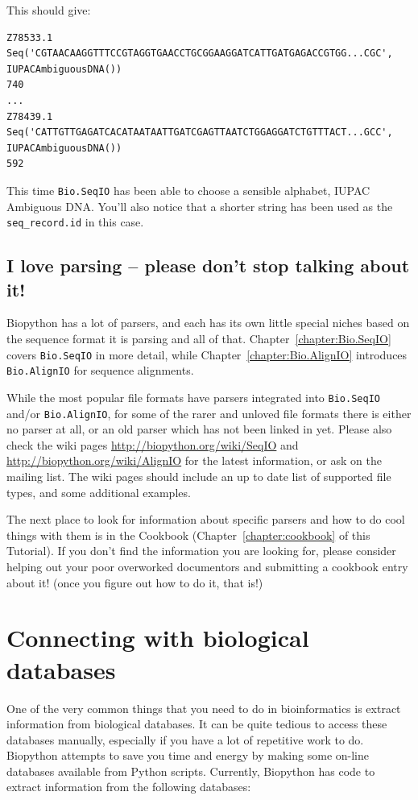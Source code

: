 \documentclass{report}
\begin{document}
\noindent This should give:

\begin{verbatim}
Z78533.1
Seq('CGTAACAAGGTTTCCGTAGGTGAACCTGCGGAAGGATCATTGATGAGACCGTGG...CGC', IUPACAmbiguousDNA())
740
...
Z78439.1
Seq('CATTGTTGAGATCACATAATAATTGATCGAGTTAATCTGGAGGATCTGTTTACT...GCC', IUPACAmbiguousDNA())
592
\end{verbatim}

This time \verb|Bio.SeqIO| has been able to choose a sensible alphabet, IUPAC Ambiguous DNA.  You'll also notice that a shorter string has been used as the \verb|seq_record.id| in this case.

\subsection{I love parsing -- please don't stop talking about it!}

Biopython has a lot of parsers, and each has its own little special niches based on the sequence format it is parsing and all of that.  Chapter~\ref{chapter:Bio.SeqIO} covers \verb|Bio.SeqIO| in more detail, while Chapter~\ref{chapter:Bio.AlignIO} introduces \verb|Bio.AlignIO| for sequence alignments.

While the most popular file formats have parsers integrated into \verb|Bio.SeqIO| and/or \verb|Bio.AlignIO|, for some of the rarer and unloved file formats there is either no parser at all, or an old parser which has not been linked in yet.
Please also check the wiki pages \url{http://biopython.org/wiki/SeqIO} and \url{http://biopython.org/wiki/AlignIO} for the latest information, or ask on the mailing list. The wiki pages should include an up to date list of supported file types, and some additional  examples.

The next place to look for information about specific parsers and how to do cool things with them is in the Cookbook (Chapter~\ref{chapter:cookbook} of this Tutorial). If you don't find the information you are looking for, please consider helping out your poor overworked documentors and submitting a cookbook entry about it! (once you figure out how to do it, that is!)

\section{Connecting with biological databases}
\label{sec:connecting-with-biological-databases}

One of the very common things that you need to do in bioinformatics is extract information from biological databases. It can be quite tedious to access these databases manually, especially if you have a lot of repetitive work to do. Biopython attempts to save you time and energy by making some on-line databases available from Python scripts. Currently, Biopython has code to extract information from the following databases:
\end{document}
